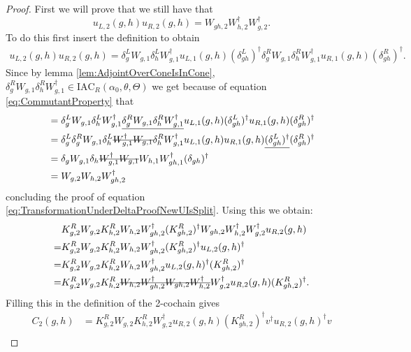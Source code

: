 \documentclass[12pt,a4paper,twoside]{article}
\newcommand{\stkout}[1]{\ifmmode\text{\sout{\ensuremath{#1}}}\else\sout{#1}\fi}
\newcommand{\IAC}{\textrm{IAC}}
\theoremstyle{definition}
\numberwithin{equation}{section}
\begin{document}
\begin{proof}
	First we will prove that we still have that
	\begin{equation}\label{eq:TransformationUnderDeltaProofNewUIsSplit}
		u_{L,2}(g,h)u_{R,2}(g,h)=W_{gh,2}W_{h,2}^\dagger W_{g,2}^\dagger.
	\end{equation}
	To do this first insert the definition to obtain
	\begin{align}
		u_{L,2}(g,h)u_{R,2}(g,h)=\delta_g^L W_{g,1}\delta_h^L W_{g,1}^\dagger u_{L,1}(g,h)(\delta_{gh}^L)^\dagger \delta_g^R W_{g,1}\delta_h^R W_{g,1}^\dagger u_{R,1}(g,h)(\delta_{gh}^R)^\dagger.
	\end{align}
	Since by lemma \ref{lem:AdjointOverConeIsInCone}, $\delta_g^R W_{g,1}\delta_h^R W_{g,1}^\dagger\in\IAC_R(\alpha_0,\theta,\Theta)$ we get because of equation \eqref{eq:CommutantProperty} that
	\begin{align}
		&=\delta_g^L W_{g,1}\delta_h^L W_{g,1}^\dagger \underline{\delta_g^R W_{g,1}\delta_h^R W_{g,1}^\dagger} u_{L,1}(g,h)(\delta_{gh}^L)^\dagger  u_{R,1}(g,h)(\delta_{gh}^R)^\dagger\\
		&=\delta_g^L \delta_g^R W_{g,1}\delta_h^L \stkout{ W_{g,1}^\dagger W_{g,1}}\delta_h^R W_{g,1}^\dagger u_{L,1}(g,h)  u_{R,1}(g,h)\underline{(\delta_{gh}^L)^\dagger}(\delta_{gh}^R)^\dagger\\
		&=\delta_g W_{g,1}\delta_h \stkout{W_{g,1}^\dagger W_{g,1}} W_{h,1} W_{gh,1}^\dagger(\delta_{gh})^\dagger\\
		&=W_{g,2}W_{h,2}W_{gh,2}^\dagger
	\end{align}
	concluding the proof of equation \eqref{eq:TransformationUnderDeltaProofNewUIsSplit}. Using this we obtain:
	\begin{align}
		&K_{g,2}^RW_{g,2}K_{h,2}^{R}W_{h,2}W_{gh,2}^\dagger(K_{gh,2}^R)^\dagger W_{gh,2}W_{h,2}^\dagger W_{g,2}^\dagger u_{R,2}(g,h)\\
		=&K_{g,2}^RW_{g,2}K_{h,2}^{R}W_{h,2}W_{gh,2}^\dagger(K_{gh,2}^R)^\dagger u_{L,2}(g,h)^\dagger\\
		=&K_{g,2}^RW_{g,2}K_{h,2}^{R}W_{h,2}W_{gh,2}^\dagger u_{L,2}(g,h)^\dagger (K_{gh,2}^R)^\dagger\\
		=&K_{g,2}^RW_{g,2}K_{h,2}^{R}\stkout{W_{h,2}W_{gh,2}^\dagger W_{gh,2}W_{h,2}^\dagger} W_{g,2}^\dagger u_{R,2}(g,h) (K_{gh,2}^R)^\dagger.
	\end{align}
	Filling this in the definition of the 2-cochain gives
	\begin{align}
		C_2(g,h)&=K_{g,2}^RW_{g,2}K_{h,2}^{R}W_{g,2}^\dagger u_{R,2}(g,h) (K_{gh,2}^R)^\dagger v^\dagger u_{R,2}(g,h)^\dagger v\\

\end{align}
\end{proof}
\end{document}
